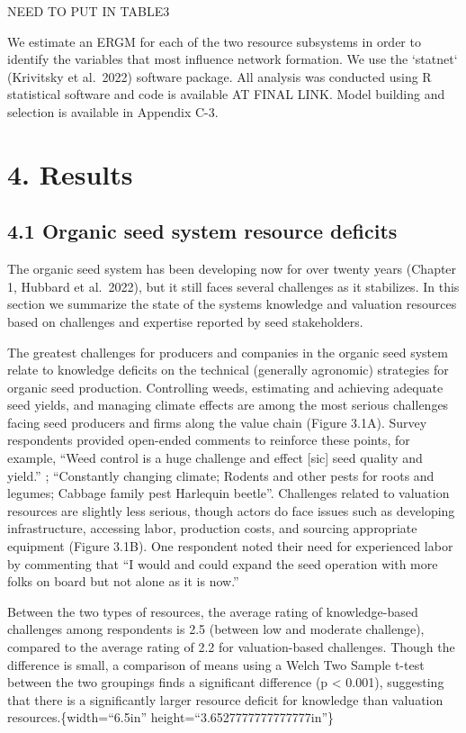 \documentclass[twoside,12pt,final]{ucthesis-CA2012}
\begin{document}
\begin{ucmainmatter}
NEED TO PUT IN TABLE3

We estimate an ERGM for each of the two resource subsystems in order to
identify the variables that most influence network formation. We use the
`statnet` (Krivitsky et al.~2022) software package. All analysis was
conducted using R statistical software and code is available AT FINAL
LINK. Model building and selection is available in Appendix C-3.

\hypertarget{results-2}{%
\section{4. Results}\label{results-2}}

\hypertarget{organic-seed-system-resource-deficits}{%
\subsection{4.1 Organic seed system resource deficits}\label{organic-seed-system-resource-deficits}}

The organic seed system has been developing now for over twenty years
(Chapter 1, Hubbard et al.~2022), but it still faces several challenges
as it stabilizes. In this section we summarize the state of the
system\textquotesingle s knowledge and valuation resources based on challenges and
expertise reported by seed stakeholders.

The greatest challenges for producers and companies in the organic seed
system relate to knowledge deficits on the technical (generally
agronomic) strategies for organic seed production. Controlling weeds,
estimating and achieving adequate seed yields, and managing climate
effects are among the most serious challenges facing seed producers and
firms along the value chain (Figure 3.1A). Survey respondents provided
open-ended comments to reinforce these points, for example, ``Weed
control is a huge challenge and effect {[}sic{]} seed quality and yield.''
; ``Constantly changing climate; Rodents and other pests for roots and
legumes; Cabbage family pest Harlequin beetle''. Challenges related to
valuation resources are slightly less serious, though actors do face
issues such as developing infrastructure, accessing labor, production
costs, and sourcing appropriate equipment (Figure 3.1B). One respondent
noted their need for experienced labor by commenting that ``I would and
could expand the seed operation with more folks on board but not alone
as it is now.''

Between the two types of resources, the average rating of
knowledge-based challenges among respondents is 2.5 (between low and
moderate challenge), compared to the average rating of 2.2 for
valuation-based challenges. Though the difference is small, a comparison
of means using a Welch Two Sample t-test between the two groupings finds
a significant difference (p \textless{} 0.001), suggesting that there is a
significantly larger resource deficit for knowledge than valuation
resources.\{width=``6.5in''
height=``3.6527777777777777in''\}
\begin{figure}


\end{figure}
\end{ucmainmatter}
\end{document}
